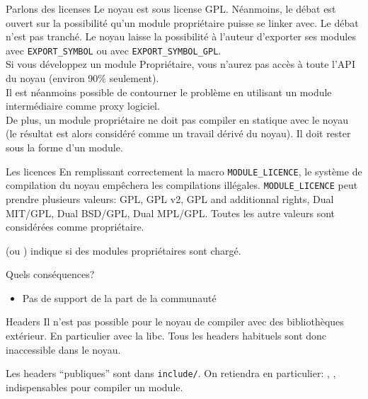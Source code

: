 \begin{frame}[fragile=singleslide]{Parlons des licenses}
  Le noyau est sous license GPL. Néanmoins, le débat est ouvert sur la
  possibilité  qu'un module  propriétaire puisse  se linker  avec.  Le
  débat n'est pas  tranché. Le noyau laisse la  possibilité à l'auteur
  d'exporter   ses   modules   avec   \verb+EXPORT_SYMBOL+   ou   avec
  \verb+EXPORT_SYMBOL_GPL+.
  \\[2ex]
  Si vous développez un module Propriétaire, vous n'aurez pas accès à
  toute l'API du noyau (environ 90\% seulement).
  \\[2ex]
  Il est néanmoins possible de contourner le problème en utilisant un
  module intermédiaire comme proxy logiciel.
  \\[2ex]
  De plus,  un module  propriétaire ne doit  pas compiler  en statique
  avec  le noyau  (le résultat  est alors  considéré comme  un travail
  dérivé du noyau). Il doit rester sous la forme d'un module.
\end{frame}
\begin{frame}[fragile=singleslide]{Les licences}
  En  remplissant  correctement  la  macro  \verb+MODULE_LICENCE+,  le
  système   de  compilation  du   noyau  empêchera   les  compilations
  illégales.   \verb+MODULE_LICENCE+ peut  prendre  plusieurs valeurs:
  GPL, GPL v2, GPL and additionnal rights, Dual MIT/GPL, Dual BSD/GPL,
  Dual  MPL/GPL.   Toutes les  autre  valeurs  sont considérées  comme
  propriétaire.

   (ou  ) indique  si des
  modules propriétaires sont chargé.
  
  Quels conséquences?
  \begin{itemize} 
  \item Pas de support de la part de la communauté
  \end{itemize} 
\end{frame}

\begin{frame}[fragile=singleslide]{Headers}
  Il  n'est  pas   possible  pour  le  noyau  de   compiler  avec  des
  bibliothèques  extérieur.  En  particulier  avec la  libc. Tous  les
  headers habituels sont donc inaccessible dans le noyau.

  Les headers ``publiques'' sont dans \verb+include/+. On retiendra en
  particulier:       ,       ,
   indispensables pour compiler un module.

\end{frame} 

